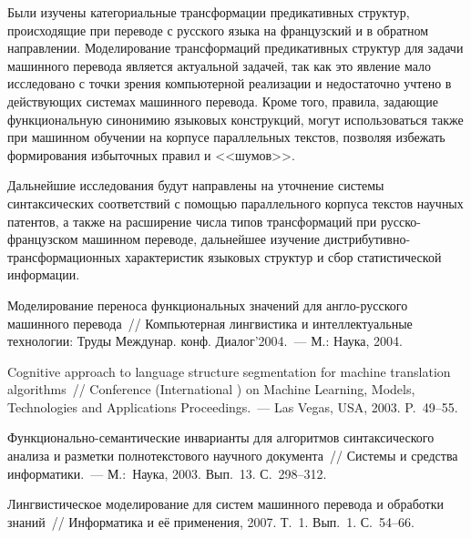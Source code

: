 \begin{multicols}{2}
     Были изучены категориальные трансформации предикативных 
структур, происходящие при переводе с русского языка на французский и в 
обратном\linebreak
направлении. Моделирование трансформаций\linebreak
предикативных 
структур для задачи машинного перевода является актуальной задачей, так 
как это явление мало исследовано с точки зрения компьютерной реализации 
и недостаточно учтено в дей\-ст\-ву\-ющих сис\-те\-мах машинного перевода. Кроме того, правила, 
задающие функциональную синонимию языковых конструкций, могут 
использоваться также при машинном обучении на корпусе параллельных 
текстов, позволяя избежать формирования избыточных правил и <<шумов>>. 
     
     Дальнейшие исследования будут направлены на уточнение сис\-те\-мы 
синтаксических соответствий с помощью параллельного корпуса текстов 
научных патентов, а также на расширение числа типов трансформаций при 
рус\-ско-фран\-цуз\-ском машинном переводе, дальнейшее изучение 
     дис\-три\-бу\-тив\-но-транс\-фор\-ма\-ци\-он\-ных характеристик 
языковых структур и сбор статистической информации.

{\small\frenchspacing
{%
\begin{thebibliography}{99}

      
     Моделирование переноса функциональных значений для 
     анг\-ло-рус\-ско\-го машинного перевода~// Компьютерная лингвистика 
и интеллектуальные технологии: Труды Междунар. конф. Диалог'2004.~--- 
М.: Наука, 2004.
     
     Cognitive approach to language structure segmentation for machine 
translation algorithms~// Conference (International ) on Machine Learning, 
Models, Technologies and Applications Proceedings.~--- Las Vegas, USA, 2003. 
     P.~49--55.
     
     Функционально-семантические инварианты для алгоритмов 
синтаксического анализа и разметки полнотекстового научного документа~// 
Системы и средства информатики.~--- М.:\ Наука, 2003. Вып.~13. 
     С.~298--312.
     
     Лингвистическое моделирование для сис\-тем машинного перевода и 
обработки знаний~// Информатика и её применения, 2007. Т.~1. Вып.~1. 
     С.~54--66.
          

\end{thebibliography}}}
\end{multicols}
